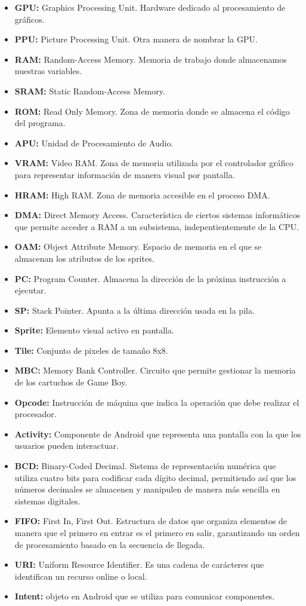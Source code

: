\begin{itemize}
	\item \textbf{GPU:} Graphics Processing Unit. Hardware dedicado al procesamiento de gráficos.
    \item \textbf{PPU:} Picture Processing Unit. Otra manera de nombrar la GPU.
	\item \textbf{RAM:} Random-Access Memory. Memoria de trabajo donde almacenamos nuestras variables.
    \item \textbf{SRAM:} Static Random-Access Memory.
    \item \textbf{ROM:} Read Only Memory. Zona de memoria donde se almacena el código del programa.
    \item \textbf{APU:} Unidad de Procesamiento de Audio.
	\item \textbf{VRAM:} Video RAM. Zona de memoria utilizada por el controlador gráfico para representar información de manera visual por pantalla.
	\item \textbf{HRAM:} High RAM. Zona de memoria accesible en el proceso DMA. 
    \item \textbf{DMA:} Direct Memory Access. Característica de ciertos sistemas informáticos que permite acceder a RAM a un subsistema, indepentientemente de la CPU.
    \item \textbf{OAM:} Object Attribute Memory. Espacio de memoria en el que se almacenan los atributos de los sprites.
    \item \textbf{PC:} Program Counter. Almacena la dirección de la próxima instrucción a ejecutar.
    \item \textbf{SP:} Stack Pointer. Apunta a la última dirección usada en la pila.
    \item \textbf{Sprite:} Elemento visual activo en pantalla.
	\item \textbf{Tile:} Conjunto de pixeles de tamaño 8x8.
    \item \textbf{MBC:} Memory Bank Controller. Circuito que permite gestionar la memoria de los cartuchos de Game Boy.
    \item \textbf{Opcode:} Instrucción de máquina que indica la operación que debe realizar el procesador.
    \item \textbf{Activity:} Componente de Android que representa una pantalla con la que los usuarios pueden interactuar.
    \item \textbf{BCD:} Binary-Coded Decimal. Sistema de representación numérica que utiliza cuatro bits para codificar cada dígito decimal, permitiendo así que los números decimales se almacenen y manipulen de manera más sencilla en sistemas digitales.
    \item \textbf{FIFO:} First In, First Out. Estructura de datos que organiza elementos de manera que el primero en entrar es el primero en salir, garantizando un orden de procesamiento basado en la secuencia de llegada.
    \item \textbf{URI:} Uniform Resource Identifier. Es una cadena de carácteres que identifican un recurso online o local.
    \item \textbf{Intent:} objeto en Android que se utiliza para comunicar componentes.
\end{itemize}


